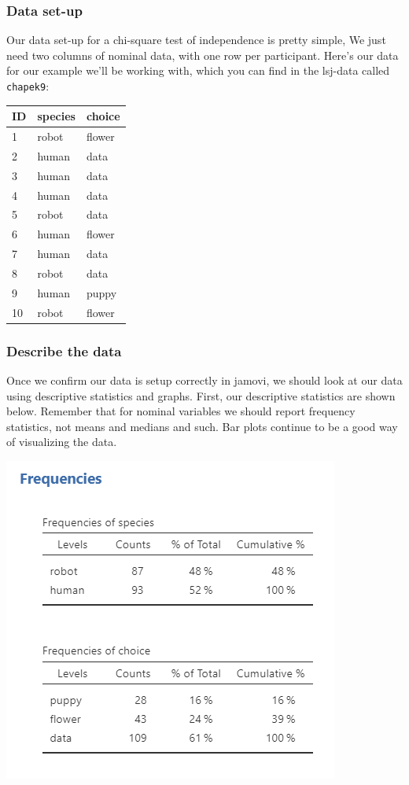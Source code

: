 \documentclass[
]{book}
\begin{document}
\hypertarget{data-set-up-4}{%
\subsubsection{Data set-up}\label{data-set-up-4}}

Our data set-up for a chi-square test of independence is pretty simple, We just need two columns of nominal data, with one row per participant. Here's our data for our example we'll be working with, which you can find in the lsj-data called \texttt{chapek9}:

\begin{longtable}[]{@{}lll@{}}
\toprule
ID & species & choice\tabularnewline
\midrule
\endhead
1 & robot & flower\tabularnewline
2 & human & data\tabularnewline
3 & human & data\tabularnewline
4 & human & data\tabularnewline
5 & robot & data\tabularnewline
6 & human & flower\tabularnewline
7 & human & data\tabularnewline
8 & robot & data\tabularnewline
9 & human & puppy\tabularnewline
10 & robot & flower\tabularnewline
\bottomrule
\end{longtable}

\hypertarget{describe-the-data-3}{%
\subsubsection{Describe the data}\label{describe-the-data-3}}

Once we confirm our data is setup correctly in jamovi, we should look at our data using descriptive statistics and graphs. First, our descriptive statistics are shown below. Remember that for nominal variables we should report frequency statistics, not means and medians and such. Bar plots continue to be a good way of visualizing the data.

\includegraphics{images/11-independence/independence_data.png}
\end{document}

